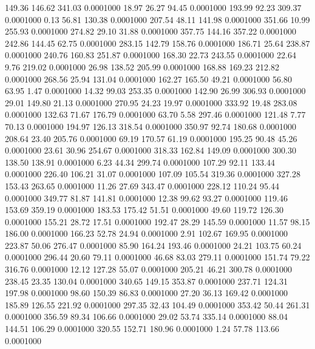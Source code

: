  149.36  146.62  341.03   0.0001000
  18.97   26.27   94.45   0.0001000
 193.99   92.23  309.37   0.0001000
   0.13   56.81  130.38   0.0001000
 207.54   48.11  141.98   0.0001000
 351.66   10.99  255.93   0.0001000
 274.82   29.10   31.88   0.0001000
 357.75  144.16  357.22   0.0001000
 242.86  144.45   62.75   0.0001000
 283.15  142.79  158.76   0.0001000
 186.71   25.64  238.87   0.0001000
 240.76  160.83  251.87   0.0001000
 168.30   22.73  243.55   0.0001000
  22.64    9.76  219.02   0.0001000
  26.98  138.52  205.99   0.0001000
 168.88  169.23  212.82   0.0001000
 268.56   25.94  131.04   0.0001000
 162.27  165.50   49.21   0.0001000
  56.80   63.95    1.47   0.0001000
  14.32   99.03  253.35   0.0001000
 142.90   26.99  306.93   0.0001000
  29.01  149.80   21.13   0.0001000
 270.95   24.23   19.97   0.0001000
 333.92   19.48  283.08   0.0001000
 132.63   71.67  176.79   0.0001000
  63.70    5.58  297.46   0.0001000
 121.48    7.77   70.13   0.0001000
 194.97  126.13  318.54   0.0001000
 350.97   92.74  180.68   0.0001000
 208.64   23.40  205.76   0.0001000
  69.19  170.57   61.19   0.0001000
 195.25   90.48   45.26   0.0001000
  23.61   30.96  254.67   0.0001000
 318.33  162.84  149.09   0.0001000
 300.30  138.50  138.91   0.0001000
   6.23   44.34  299.74   0.0001000
 107.29   92.11  133.44   0.0001000
 226.40  106.21   31.07   0.0001000
 107.09  105.54  319.36   0.0001000
 327.28  153.43  263.65   0.0001000
  11.26   27.69  343.47   0.0001000
 228.12  110.24   95.44   0.0001000
 349.77   81.87  141.81   0.0001000
  12.38   99.62   93.27   0.0001000
 119.46  153.69  359.19   0.0001000
 183.53  175.42   51.51   0.0001000
  49.60  119.72  126.30   0.0001000
 155.21   28.72   17.51   0.0001000
 192.47   28.29  145.59   0.0001000
  11.57   98.15  186.00   0.0001000
 166.23   52.78   24.94   0.0001000
   2.91  102.67  169.95   0.0001000
 223.87   50.06  276.47   0.0001000
  85.90  164.24  193.46   0.0001000
  24.21  103.75   60.24   0.0001000
 296.44   20.60   79.11   0.0001000
  46.68   83.03  279.11   0.0001000
 151.74   79.22  316.76   0.0001000
  12.12  127.28   55.07   0.0001000
 205.21   46.21  300.78   0.0001000
 238.45   23.35  130.04   0.0001000
 340.65  149.15  353.87   0.0001000
 237.71  124.31  197.98   0.0001000
  98.60  150.39   86.83   0.0001000
  27.20   36.13  169.42   0.0001000
 185.89  126.55  221.92   0.0001000
 297.35   32.43  104.49   0.0001000
 353.42   50.44  261.31   0.0001000
 356.59   89.34  106.66   0.0001000
  29.02   53.74  335.14   0.0001000
  88.04  144.51  106.29   0.0001000
 320.55  152.71  180.96   0.0001000
   1.24   57.78  113.66   0.0001000
